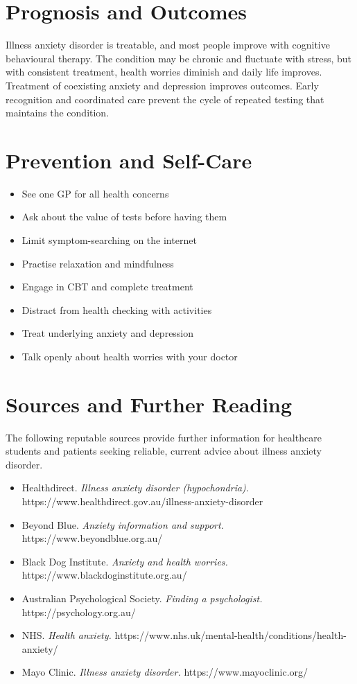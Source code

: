 \section*{Prognosis and Outcomes}
Illness anxiety disorder is treatable, and most people improve with cognitive behavioural therapy. The condition may be chronic and fluctuate with stress, but with consistent treatment, health worries diminish and daily life improves. Treatment of coexisting anxiety and depression improves outcomes. Early recognition and coordinated care prevent the cycle of repeated testing that maintains the condition.

\section*{Prevention and Self-Care}
\begin{itemize}
    \item See one GP for all health concerns
    \item Ask about the value of tests before having them
    \item Limit symptom-searching on the internet
    \item Practise relaxation and mindfulness
    \item Engage in CBT and complete treatment
    \item Distract from health checking with activities
    \item Treat underlying anxiety and depression
    \item Talk openly about health worries with your doctor
\end{itemize}

\section*{Sources and Further Reading}
The following reputable sources provide further information for healthcare students and patients seeking reliable, current advice about illness anxiety disorder.

\begin{itemize}
    \item Healthdirect. \textit{Illness anxiety disorder (hypochondria).} https://www.healthdirect.gov.au/illness-anxiety-disorder
    \item Beyond Blue. \textit{Anxiety information and support.} https://www.beyondblue.org.au/
    \item Black Dog Institute. \textit{Anxiety and health worries.} https://www.blackdoginstitute.org.au/
    \item Australian Psychological Society. \textit{Finding a psychologist.} https://psychology.org.au/
    \item NHS. \textit{Health anxiety.} https://www.nhs.uk/mental-health/conditions/health-anxiety/
    \item Mayo Clinic. \textit{Illness anxiety disorder.} https://www.mayoclinic.org/
\end{itemize}
